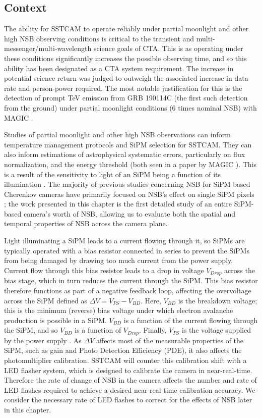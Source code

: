 \subsection{Context}
\label{sec:intro:context}
The ability for SSTCAM to operate reliably under partial moonlight and other high NSB observing conditions is critical to the transient and multi-messenger/multi-wavelength science goals of CTA. This is as operating under these conditions significantly increases the possible observing time, and so this ability has been designated as a CTA system requirement.  The increase in potential science return was judged to outweigh the associated increase in data rate and person-power required. The most notable justification for this is the detection of prompt TeV emission from GRB 190114C (the first such detection from the ground) under partial moonlight conditions (6 times nominal NSB) with MAGIC \cite{magicGRB}. 

Studies of partial moonlight and other high NSB observations can inform temperature management protocols and SiPM selection for SSTCAM. They can also inform estimations of astrophysical systematic errors, particularly on flux normalization, and the energy threshold \cite{magicmoon} (both seen in a paper by MAGIC \cite{magicmoon}). This is a result of the sensitivity to light of an SiPM being a function of its illumination \cite{1mhighnsb}. The majority of previous studies concerning NSB for SiPM-based Cherenkov cameras have primarily focused on NSB's effect on single SiPM pixels \cite{1mhighnsb} \cite{2msipm} \cite{1mcalib} \cite{lstnsb}; the work presented in this chapter is the first detailed study of an entire SiPM-based camera's worth of NSB, allowing us to evaluate both the spatial and temporal properties of NSB across the camera plane.

Light illuminating a SiPM leads to a current flowing through it, so SiPMs are typically operated with a bias resistor connected in series to prevent the SiPMs from being damaged by drawing too much current from the power supply. Current flow through this bias resistor leads to a drop in voltage $V_{Drop}$ across the bias stage, which in turn reduces the current through the SiPM. This bias resistor therefore functions as part of a negative feedback loop, affecting the overvoltage across the SiPM defined as $\Delta V=V_{PS}-V_{BD}$. Here, $V_{BD}$ is the breakdown voltage; this is the minimum (reverse) bias voltage under which electron avalanche production is possible in a SiPM. $V_{BD}$ is a function of the current flowing through the SiPM, and so $V_{BD}$ is a function of $V_{Drop}$. Finally, $V_{PS}$ is the voltage supplied by the power supply \cite{1mhighnsb}. As $\Delta V$ affects most of the measurable properties of the SiPM, such as gain and Photo Detection Efficiency (PDE), it also affects the photomultiplier calibration. SSTCAM will counter this calibration shift with a LED flasher system, which is designed to calibrate the camera in near-real-time. Therefore the rate of change of NSB in the camera affects the number and rate of LED flashes required to achieve a desired near-real-time calibration accuracy. We consider the necessary rate of LED flashes to correct for the effects of NSB later in this chapter.


